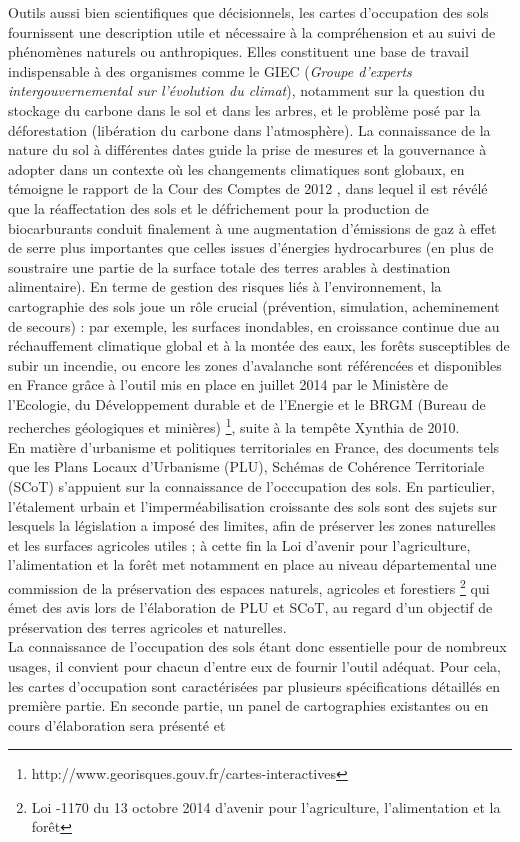 Outils aussi bien scientifiques que décisionnels, les cartes d'occupation des sols fournissent une description utile et nécessaire à la compréhension et au suivi de phénomènes naturels ou anthropiques. Elles constituent une base de travail indispensable à des organismes comme le GIEC (\textit{Groupe d'experts intergouvernemental sur l'évolution du climat}), notamment sur la question du stockage du carbone dans le sol et dans les arbres, et le problème posé par la déforestation (libération du carbone dans l'atmosphère). La connaissance de la nature du sol à différentes dates guide la prise de mesures et la gouvernance à adopter dans un contexte où les changements climatiques sont globaux, en témoigne le rapport de la Cour des Comptes de 2012 \citep{cc2018}, dans lequel il est révélé que la réaffectation des sols et le défrichement pour la production de biocarburants conduit finalement à une augmentation d'émissions de gaz à effet de serre plus importantes que celles issues d'énergies hydrocarbures (en plus de soustraire une partie de la surface totale des terres arables à destination alimentaire). En terme de gestion des risques liés à l'environnement, la cartographie des sols joue un rôle crucial (prévention, simulation, acheminement de secours) : par exemple, les surfaces inondables, en croissance continue due au réchauffement climatique global et à la montée des eaux, les forêts susceptibles de subir un incendie, ou encore les zones d'avalanche sont référencées et disponibles en France grâce à l'outil mis en place en juillet 2014 par le Ministère de l'Ecologie, du Développement durable et de l'Energie et le BRGM (Bureau de recherches géologiques et minières) \footnote{http://www.georisques.gouv.fr/cartes-interactives}, suite à la tempête Xynthia de 2010.\\
En matière d'urbanisme et politiques territoriales en France, des documents tels que les Plans Locaux d'Urbanisme (PLU), Schémas de Cohérence Territoriale (SCoT) s'appuient sur la connaissance de l'occcupation des sols. En particulier, l'étalement urbain et l'imperméabilisation croissante des sols sont des sujets sur lesquels la législation a imposé des limites, afin de préserver les zones naturelles et les surfaces agricoles utiles ; à cette fin la Loi d'avenir pour l'agriculture, l'alimentation et la forêt met notamment en place au niveau départemental une commission de la préservation des espaces naturels, agricoles et forestiers \footnote{Loi -1170 du 13 octobre 2014 d'avenir pour l'agriculture, l'alimentation et la forêt} qui émet des avis lors de l'élaboration de PLU et SCoT, au regard d'un objectif de préservation des terres agricoles et naturelles.\\
La connaissance de l'occupation des sols étant donc essentielle pour de nombreux usages, il convient pour chacun d'entre eux de fournir l'outil adéquat. Pour cela, les cartes d'occupation sont caractérisées par plusieurs spécifications détaillés en première partie. En seconde partie, un panel de cartographies existantes ou en cours d'élaboration sera présenté et



